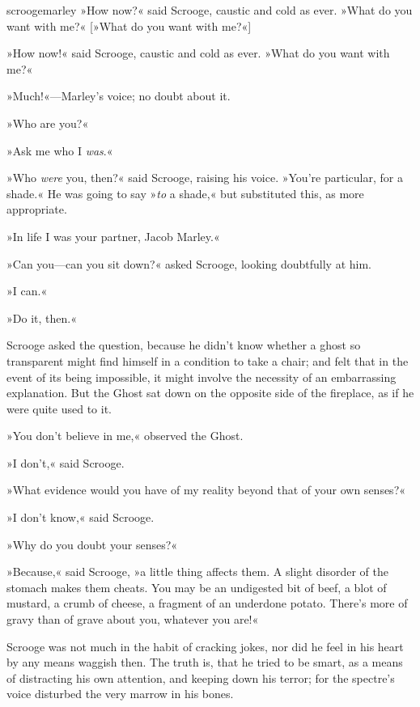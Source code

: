 \begin{colorbigpic}
	[\bigpicsize]
	{scroogemarley}
	{»How now?« said Scrooge, caustic and cold as ever. »What do you want with me?«}
	[»What do you want with me?«]
\end{colorbigpic}


»How now!« said Scrooge, caustic and cold as ever. »What do you want with me?«

»Much!«---Marley's voice; no doubt about it.

»Who are you?«

»Ask me who I \textit{was}.«

»Who \textit{were} you, then?« said Scrooge, raising his voice. »You're particular, for a shade.« He was going to say »\textit{to} a shade,« but substituted this, as more appropriate.

»In life I was your partner, Jacob Marley.«

»Can you---can you sit down?« asked Scrooge, looking doubtfully at him.

»I can.«

»Do it, then.«

Scrooge asked the question, because he didn't know whether a ghost so transparent might find himself in a condition to take a chair; and felt that in the event of its being impossible, it might involve the necessity of an embarrassing explanation. But the Ghost sat down on the opposite side of the fireplace, as if he were quite used to it.

»You don't believe in me,« observed the Ghost.

»I don't,« said Scrooge.

»What evidence would you have of my reality beyond that of your own senses?«

»I don't know,« said Scrooge.

»Why do you doubt your senses?«

»Because,« said Scrooge, »a little thing affects them. A slight disorder of the stomach makes them cheats. You may be an undigested bit of beef, a blot of mustard, a crumb of cheese, a fragment of an underdone potato. There's more of gravy than of grave about you, whatever you are!«

Scrooge was not much in the habit of cracking jokes, nor did he feel in his heart by any means waggish then. The truth is, that he tried to be smart, as a means of distracting his own attention, and keeping down his terror; for the spectre's voice disturbed the very marrow in his bones.

